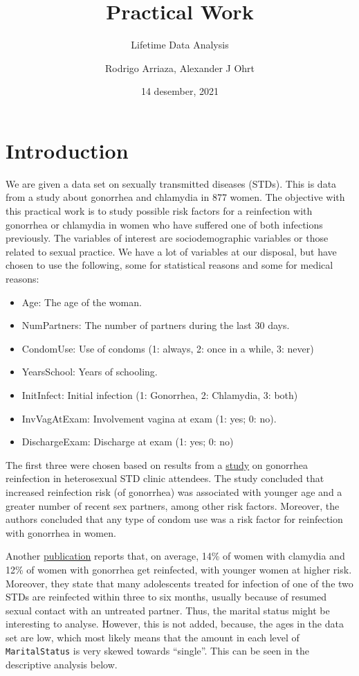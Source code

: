 \documentclass[
]{article}
\title{Practical Work}
\subtitle{Lifetime Data Analysis}
\author{Rodrigo Arriaza, Alexander J Ohrt}
\date{14 desember, 2021}
\providecommand{\tightlist}{%
  \setlength{\itemsep}{0pt}\setlength{\parskip}{0pt}}
\begin{document}
\maketitle

\hypertarget{introduction}{%
\section{Introduction}\label{introduction}}

We are given a data set on sexually transmitted diseases (STDs). This is data from a study about gonorrhea and chlamydia in 877 women. The objective with this practical work is to study possible risk factors for a reinfection with gonorrhea or chlamydia in women who have suffered one of both infections previously. The variables of interest are sociodemographic variables or those related to sexual practice. We have a lot of variables at our disposal, but have chosen to use the following, some for statistical reasons and some for medical reasons:

\begin{itemize}
\tightlist
\item
  Age: The age of the woman.
\item
  NumPartners: The number of partners during the last 30 days.
\item
  CondomUse: Use of condoms (1: always, 2: once in a while, 3: never)
\item
  YearsSchool: Years of schooling.
\item
  InitInfect: Initial infection (1: Gonorrhea, 2: Chlamydia, 3: both)
\item
  InvVagAtExam: Involvement vagina at exam (1: yes; 0: no).
\item
  DischargeExam: Discharge at exam (1: yes; 0: no)
\end{itemize}

The first three were chosen based on results from a \href{https://www.ncbi.nlm.nih.gov/pmc/articles/PMC1744639/}{study} on gonorrhea reinfection in heterosexual STD clinic attendees. The study concluded that increased reinfection risk (of gonorrhea) was associated with younger age and a greater number of recent sex partners, among other risk factors. Moreover, the authors concluded that any type of condom use was a risk factor for reinfection with gonorrhea in women.

Another \href{https://policylab.chop.edu/sites/default/files/pdf/publications/Preventing_Chlamydia_Gonorrhea_Reinfection_through_Increased_Use_of_EPT.pdf}{publication} reports that, on average, 14\% of women with clamydia and 12\% of women with gonorrhea get reinfected, with younger women at higher risk. Moreover, they state that many adolescents treated for infection of one of the two STDs are reinfected within three to six months, usually because of resumed sexual contact with an untreated partner. Thus, the marital status might be interesting to analyse. However, this is not added, because, the ages in the data set are low, which most likely means that the amount in each level of \texttt{MaritalStatus} is very skewed towards ``single''. This can be seen in the descriptive analysis below.
\end{document}
